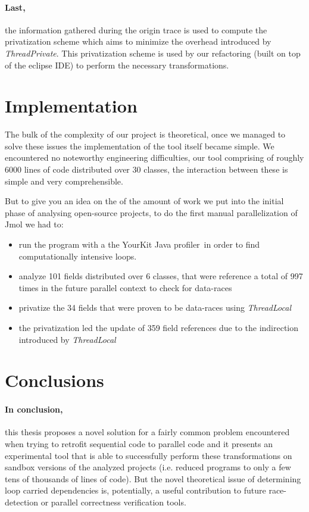 \paragraph{Last,}the information gathered during the origin trace is used to
compute the privatization scheme which aims to minimize the overhead introduced by
\emph{ThreadPrivate}. This privatization scheme is used by our refactoring
(built on top of the eclipse IDE) to perform the necessary transformations.

\section{Implementation}
The bulk of the complexity of our project is theoretical, once we managed to
solve these issues the implementation of the tool itself became simple. We
encountered no noteworthy engineering difficulties, our tool comprising of
roughly 6000 lines of code distributed over 30 classes, the interaction between
these is simple and very comprehensible.

But to give you an idea on the of the amount of work we put into the initial
phase of analysing open-source projects, to do the first manual parallelization
of Jmol we had to:
\begin{itemize}
  \item run the program with a the YourKit Java profiler~\cite{YourKit}in order
  to find computationally intensive loops.
  \item analyze 101 fields distributed over 6 classes, that were reference a
  total of 997 times in the future parallel context to check for data-races
  \item privatize the 34 fields that were proven to be data-races using
  \emph{ThreadLocal}
  \item the privatization led the update of 359 field references due to the
  indirection introduced by \emph{ThreadLocal}
\end{itemize}

\section{Conclusions}

\paragraph{In conclusion,} this thesis proposes a novel solution for a fairly
common problem encountered when trying to retrofit sequential code to parallel
code and it presents an experimental tool that is able to successfully perform
these transformations on sandbox versions of the analyzed projects (i.e.
reduced programs to only a few tens of thousands of lines of code). But the
novel theoretical issue of determining loop carried dependencies is,
potentially, a useful contribution to future race-detection or parallel
correctness verification tools.
